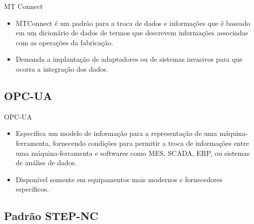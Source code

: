 \documentclass[aspectratio=169]{beamer}
\begin{document}
{\begin{frame}{MT Connect}
  \begin{itemize}

    \item {
      MTConnect \'e um padr\~ao para a troca de dados e informa\c c\~oes 
      que \'e baseado em um dicion\'ario de dados de termos que descrevem 
      informa\c c\~oes associadas com as opera\c c\~oes da fabrica\c c\~ao.
    }

    \item {
      Demanda a implanta\c c\~ao de adaptadores ou de sistemas 
      invasivos para que ocorra a integra\c c\~ao dos dados.      
    }   

  \end{itemize}   

\end{frame}


\subsection{OPC-UA}

\begin{frame}{OPC-UA}

  \begin{itemize}

    \item {
      Especifica um modelo de informa\c c\~ao para a representa\c c\~ao 
      de uma m\'aquina-ferramenta, fornecendo condi\c c\~oes para permitir
      a troca de informa\c c\~oes entre uma m\'aquina-ferramenta e softwares
      como MES, SCADA, ERP, ou sistemas de an\'alise de dados.
    }

    \item {
      Disponível somente em equipamentos mais modernos e fornecedores 
      específicos.
    }

  \end{itemize}   

\end{frame}


\subsection{Padrão STEP-NC}

}
\end{document}

